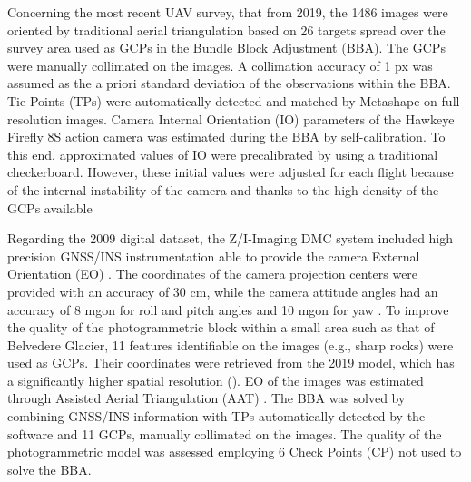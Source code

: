 Concerning the most recent UAV survey, that from 2019, the 1486 images were oriented by traditional aerial triangulation based on 26 targets spread over the survey
 area used as GCPs in the Bundle Block Adjustment (BBA).
The GCPs were manually collimated on the images.
A collimation accuracy of 1 px was assumed as the a priori standard deviation of the observations within the BBA. 
Tie Points (TPs) were automatically detected and matched by Metashape on full-resolution images.
Camera Internal Orientation (IO) parameters of the Hawkeye Firefly 8S action camera was
estimated during the BBA by self-calibration. 
To this end, approximated values of IO were precalibrated by using a traditional checkerboard. 
However, these initial values were adjusted for each flight because of the internal instability of the camera and thanks to the high density of the GCPs available

Regarding the 2009 digital dataset, the Z/I-Imaging DMC system included high precision GNSS/INS instrumentation able to provide the camera External Orientation (EO) \citep{Hinz2001}. 
The coordinates of the camera projection centers were provided with an accuracy of 30 cm, while the camera attitude angles had an accuracy of 8 mgon for roll and pitch angles and 10 mgon for yaw \citep{Forlani_pinto2001}.
To improve the quality of the photogrammetric block within a small area such as that of Belvedere Glacier, 11 features identifiable on the images (e.g., sharp rocks) were used as GCPs. 
Their coordinates were retrieved from the 2019 model, which has a significantly higher spatial resolution (). 
EO of the images was estimated through Assisted Aerial Triangulation (AAT) \citep{ioli2021_lowcost_dgps}. 
The BBA was solved by combining GNSS/INS information with TPs automatically detected by the software and 11 GCPs, manually collimated on the images. 
The quality of the photogrammetric model was assessed employing 6 Check Points (CP) not used to solve the BBA. 

